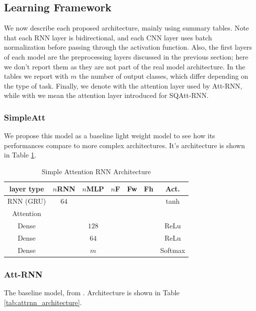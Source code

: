 \subsection{Learning Framework}
\label{sec:learning_framework}

We now describe each proposed architecture, mainly using summary tables. Note that each RNN layer is bidirectional, and each CNN layer uses batch normalization before passing through the activation function. Also, the first layers of each model are the preprocessing layers discussed in the previous section; here we don't report them as they are not part of the real model architecture. In the tables we report with $m$ the number of output classes, which differ depending on the type of task. Finally, we denote with  the attention layer used by Att-RNN, while with  we mean the attention layer introduced for SQAtt-RNN.

\subsubsection{\textbf{SimpleAtt}}
We propose this model as a baseline light weight model to see how its performances compare to more complex architectures. It's architecture is shown in Table \ref{tab:simpleatt_architecture}.

\begin{table}[h]
	\caption{Simple Attention RNN Architecture}
	\label{tab:simpleatt_architecture}
	\begin{tabular}{|c|c|c|c|c|c|c|}
		\hline
		layer type & $n$RNN & $n$MLP & $n$F & Fw & Fh & Act.    \\ \hline
		RNN (GRU)  & $64$   &      &    &    &    & tanh    \\ \hline
		Attention  &      &      &    &    &    &         \\ \hline
		Dense      &      & $128$  &    &    &    & ReLu    \\ \hline
		Dense      &      & $64$   &    &    &    & ReLu    \\ \hline
		Dense      &      & $m$  &    &    &    & Softmax \\ \hline
	\end{tabular}
\end{table}
\subsubsection{\textbf{Att-RNN}}
The baseline model, from \cite{attention2018andreade}. Architecture is shown in Table \ref{tab:attrnn_architecture}.


